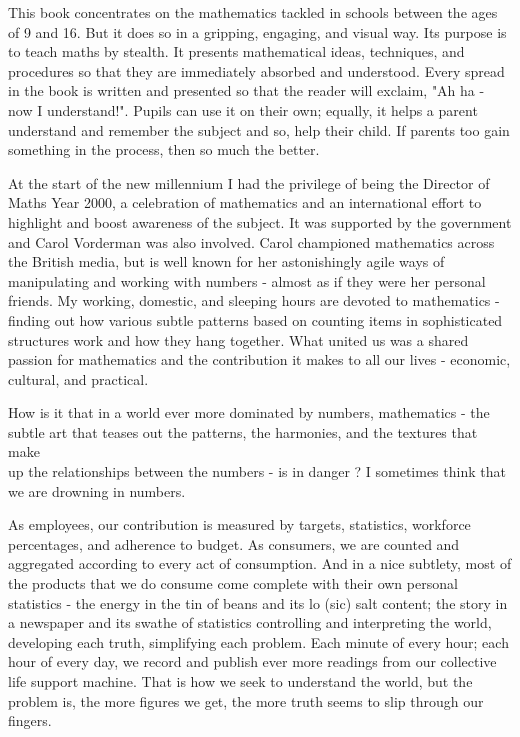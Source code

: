 \documentclass[10pt]{article}
\begin{document}
This book concentrates on the mathematics tackled in schools between the ages of 9 and 16. But it does so in a gripping, engaging, and visual way. Its purpose is to teach maths by stealth. It presents mathematical ideas, techniques, and procedures so that they are immediately absorbed and understood. Every spread in the book is written and presented so that the reader will exclaim, "Ah ha - now I understand!". Pupils can use it on their own; equally, it helps a parent understand and remember the subject and so, help their child. If parents too gain something in the process, then so much the better.

At the start of the new millennium I had the privilege of being the Director of Maths Year 2000, a celebration of mathematics and an international effort to highlight and boost awareness of the subject. It was supported by the government and Carol Vorderman was also involved. Carol championed mathematics across the British media, but is well known for her astonishingly agile ways of manipulating and working with numbers - almost as if they were her personal friends. My working, domestic, and sleeping hours are devoted to mathematics - finding out how various subtle patterns based on counting items in sophisticated structures work and how they hang together. What united us was a shared passion for mathematics and the contribution it makes to all our lives - economic, cultural, and practical.

How is it that in a world ever more dominated by numbers, mathematics - the subtle art that teases out the patterns, the harmonies, and the textures that make\\
up the relationships between the numbers - is in danger ? I sometimes think that we are drowning in numbers.

As employees, our contribution is measured by targets, statistics, workforce percentages, and adherence to budget. As consumers, we are counted and aggregated according to every act of consumption. And in a nice subtlety, most of the products that we do consume come complete with their own personal statistics - the energy in the tin of beans and its lo (sic) salt content; the story in a newspaper and its swathe of statistics controlling and interpreting the world, developing each truth, simplifying each problem. Each minute of every hour; each hour of every day, we record and publish ever more readings from our collective life support machine. That is how we seek to understand the world, but the problem is, the more figures we get, the more truth seems to slip through our fingers.
\end{document}
